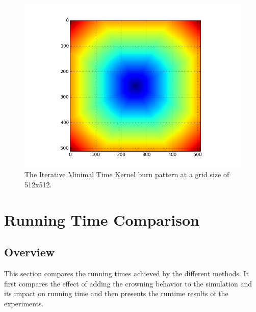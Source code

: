 \begin{figure}%
\centering
  \includegraphics[height=0.27\textheight]{figures/results/it_min_time.png}
  \caption{The Iterative Minimal Time Kernel burn pattern at a grid size of 512x512.}
  \label{fig:it_min_time}
\end{figure}

\section{Running Time Comparison}
\subsection{Overview}
This section compares the running times achieved by the different methods. It first compares the effect of adding the crowning behavior to the simulation and its impact on running time and then presents the runtime results of the experiments.

